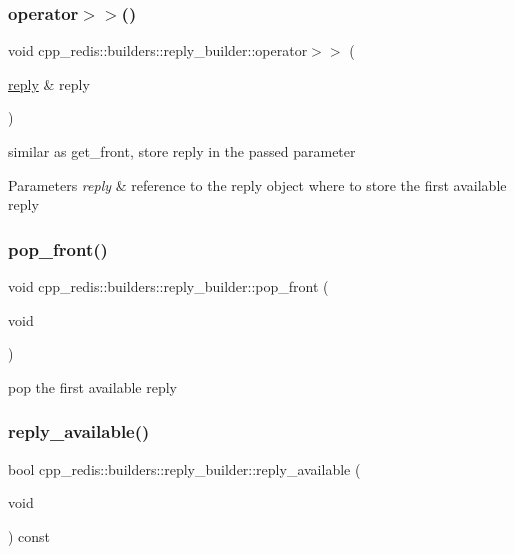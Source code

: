 \subsubsection{\texorpdfstring{operator$>$$>$()}{operator>>()}}
{\footnotesize\ttfamily void cpp\+\_\+redis\+::builders\+::reply\+\_\+builder\+::operator$>$$>$ (\begin{DoxyParamCaption}\item[{\hyperlink{classcpp__redis_1_1reply}{reply} \&}]{reply }\end{DoxyParamCaption})}

similar as get\+\_\+front, store reply in the passed parameter


\begin{DoxyParams}{Parameters}
{\em reply} & reference to the reply object where to store the first available reply \\
\hline
\end{DoxyParams}
\mbox{\label{classcpp__redis_1_1builders_1_1reply__builder_a0b5fb8dd4fc87c508e0a45647bc86b16}} 
\subsubsection{\texorpdfstring{pop\+\_\+front()}{pop\_front()}}
{\footnotesize\ttfamily void cpp\+\_\+redis\+::builders\+::reply\+\_\+builder\+::pop\+\_\+front (\begin{DoxyParamCaption}\item[{void}]{ }\end{DoxyParamCaption})}

pop the first available reply \mbox{\label{classcpp__redis_1_1builders_1_1reply__builder_af7d8e764ab591390cd1eae8801cd691c}} 
\subsubsection{\texorpdfstring{reply\+\_\+available()}{reply\_available()}}
{\footnotesize\ttfamily bool cpp\+\_\+redis\+::builders\+::reply\+\_\+builder\+::reply\+\_\+available (\begin{DoxyParamCaption}\item[{void}]{ }\end{DoxyParamCaption}) const}

